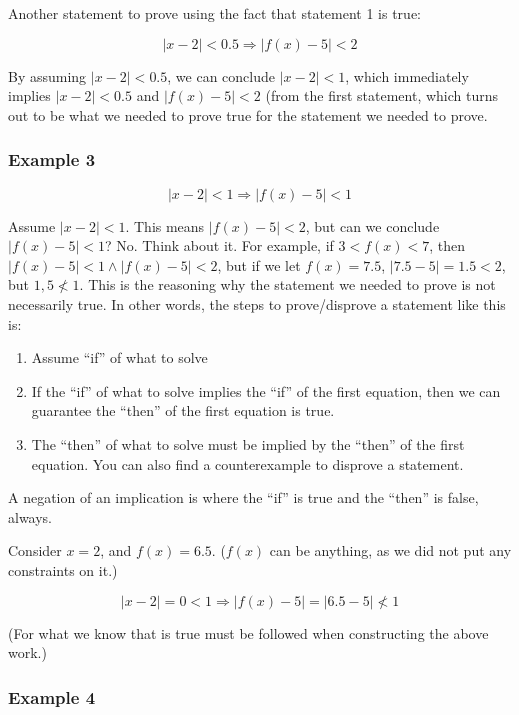 \documentclass[12pt]{article}
\theoremstyle{plain}
\theoremstyle{remark}
\theoremstyle{definition}
\begin{document}
Another statement to prove using the fact that statement 1 is true:

\[|x - 2| < 0.5 \Rightarrow \left| f(x) - 5 \right| < 2\]

By assuming \(|x - 2| < 0.5\), we can conclude \(|x - 2| < 1\), which
immediately implies \(|x - 2| < 0.5\) and
\(\left| f(x) - 5 \right| < 2\) (from the first statement, which turns
out to be what we needed to prove true for the statement we needed to
prove.


\subsubsection{Example 3}

\[|x - 2| < 1 \Rightarrow \left| f(x) - 5 \right| < 1\]

Assume \(|x - 2| < 1\). This means \(\left| f(x) - 5 \right| < 2\), but
can we conclude \(|f(x) - 5| < 1\)? No. Think about it. For example, if
\(3 < f(x) < 7\), then
\(\left| f(x) - 5 \right| < 1 \land \left| f(x) - 5 \right| < 2\), but
if we let \(f(x) = 7.5\), \(|7.5 - 5| = 1.5 < 2\), but \(1,5 \nless 1\).
This is the reasoning why the statement we needed to prove is not
necessarily true. In other words, the steps to prove/disprove a
statement like this is:

\begin{enumerate}
\def\labelenumi{\arabic{enumi}.}
\item
  Assume ``if'' of what to solve
\item
  If the ``if'' of what to solve implies the ``if'' of the first
  equation, then we can guarantee the ``then'' of the first equation is
  true.
\item
  The ``then'' of what to solve must be implied by the ``then'' of the
  first equation. You can also find a counterexample to disprove a
  statement.
\end{enumerate}

A negation of an implication is where the ``if'' is true and the
``then'' is false, always.

Consider \(x = 2\), and \(f(x) = 6.5\). (\(f(x)\) can be anything, as we
did not put any constraints on it.)

\[|x - 2| = 0 < 1 \Rightarrow \left| f(x) - 5 \right| = |6.5 - 5| \nless 1\]

(For what we know that is true must be followed when constructing the
above work.)


\subsubsection{Example 4}
\end{document}
